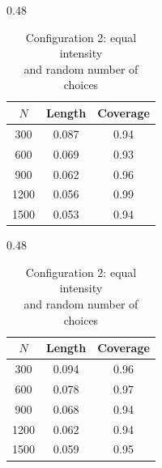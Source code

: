 \documentclass[12pt]{amsart}
\theoremstyle{plain}
\theoremstyle{remark}
\numberwithin{equation}{section}
\begin{document}
\begin{table}[htbp]
\centering
\renewcommand{\arraystretch}{0.75}
\begin{subtable}{0.48\textwidth}
\setlength{\tabcolsep}{10pt}
\begin{tabular}{ccc}
\toprule
$N$ & Length & Coverage\\
\midrule
300  & 0.087 & 0.94\\
600  & 0.069 & 0.93 \\
900  & 0.062 & 0.96 \\
1200 & 0.056 & 0.99 \\
1500 & 0.053 & 0.94 \\
\bottomrule
\end{tabular}
\centering
\caption{\centering Configuration 1: equal intensity \\ and constant number of choices}
\end{subtable}
\hfill
\begin{subtable}{0.48\textwidth}
\setlength{\tabcolsep}{10pt}
\begin{tabular}{ccc}
\toprule
$N$ & Length & Coverage\\
\midrule
300  & 0.094 & 0.96\\
600  & 0.078 & 0.97\\
900  & 0.068 & 0.94\\
1200 & 0.062 & 0.94\\
1500 & 0.059 & 0.95\\
\bottomrule
\end{tabular}
\centering
\caption{\centering Configuration 2: equal intensity \\ and random number of choices}
\end{subtable}

\vspace{0.4cm}


\end{table}
\end{document}
